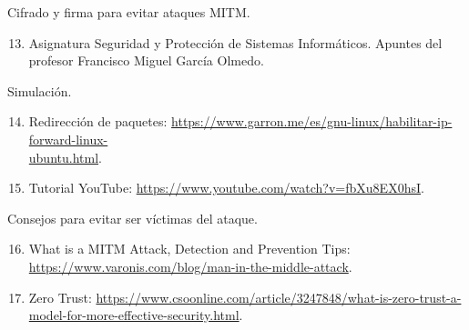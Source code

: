 \documentclass[11pt]{article}
\begin{document}
Cifrado y firma para evitar ataques MITM.
\begin{enumerate}
	\setcounter{enumi}{12}
	\item\label{bib-item-13} Asignatura Seguridad y Protección de Sistemas Informáticos. Apuntes del profesor Francisco Miguel García Olmedo.
\end{enumerate}

Simulación.
\begin{enumerate}
	\setcounter{enumi}{13}
	\item\label{bib-item-14} Redirección de paquetes: \href{https://www.garron.me/es/gnu-linux/habilitar-ip-forward-linux-ubuntu.html}{https://www.garron.me/es/gnu-linux/habilitar-ip-forward-linux-\\ubuntu.html}.
	\item\label{bib-item-15} Tutorial YouTube: \href{https://www.youtube.com/watch?v=fbXu8EX0hsI}{https://www.youtube.com/watch?v=fbXu8EX0hsI}.
\end{enumerate}

Consejos para evitar ser víctimas del ataque.
\begin{enumerate}
	\setcounter{enumi}{15}
	\item\label{bib-item-16} What is a MITM Attack, Detection and Prevention Tips: \href{https://www.varonis.com/blog/man-in-the-middle-attack}{https://www.varonis.com/blog/man-in-the-middle-attack}.
	\item\label{bib-item-17} Zero Trust: \href{https://www.csoonline.com/article/3247848/what-is-zero-trust-a-model-for-more-effective-security.html}{https://www.csoonline.com/article/3247848/what-is-zero-trust-a-model-for-more-effective-security.html}.
\end{enumerate}
\end{document}
